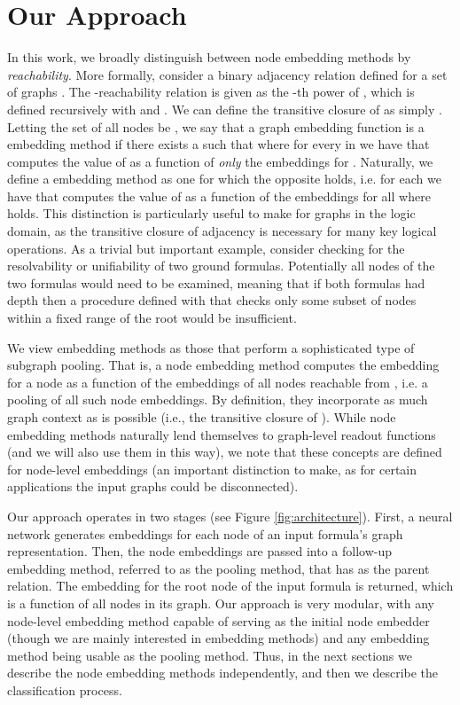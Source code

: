 \documentclass{article}
\begin{document}
 



\section{Our Approach}
\label{sec:reachability}
In this work, we broadly distinguish between node embedding methods by \textit{reachability}. More formally, consider a binary adjacency relation  defined for a set of graphs . The -reachability relation  is given as the -th power of , which is defined recursively with  and . We can define the transitive closure of  as simply . Letting the set of all nodes be , we say that a graph embedding function  is a  embedding method if there exists a  such that  where for every  in  we have that  computes the value of  as a function of \textit{only} the embeddings for . Naturally, we define a  embedding method as one for which the opposite holds, i.e. for each  we have that  computes the value of  as a function of the embeddings for all  where  holds. This distinction is particularly useful to make for graphs in the logic domain, as the transitive closure of adjacency is necessary for many key logical operations. As a trivial but important example, consider checking for the resolvability or unifiability of two ground formulas. Potentially all nodes of the two formulas would need to be examined, meaning that if both formulas had depth  then a procedure defined with  that checks only some subset of nodes within a fixed range of the root would be insufficient.

We view  embedding methods as those that perform a sophisticated type of subgraph pooling. That is, a  node embedding method computes the embedding for a node  as a function of the embeddings of all nodes reachable from , i.e. a pooling of all such node embeddings. By definition, they incorporate as much graph context as is possible (i.e., the transitive closure of ). While  node embedding methods naturally lend themselves to graph-level readout functions (and we will also use them in this way), we note that these concepts are defined for node-level embeddings (an important distinction to make, as for certain applications the input graphs could be disconnected).

Our approach operates in two stages (see Figure \ref{fig:architecture}). First, a neural network generates embeddings for each node of an input formula's graph representation. Then, the node embeddings are passed into a follow-up  embedding method, referred to as the pooling method, that has  as the parent relation. The embedding for the root node of the input formula is returned, which is a function of all nodes in its graph. Our approach is very modular, with any node-level embedding method capable of serving as the initial node embedder (though we are mainly interested in  embedding methods) and any  embedding method being usable as the pooling method. Thus, in the next sections we describe the node embedding methods independently, and then we describe the classification process.
\end{document}
